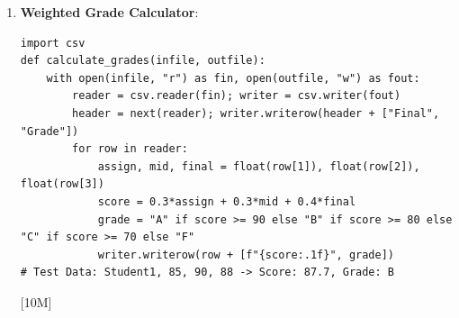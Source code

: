 \begin{solutionbox}
\begin{enumerate}[start=17]
\begin{lstlisting}[language=Python3]
def rle_verify(infile, compfile):
    with open(infile, "r") as f: orig = f.read()
    with open(compfile, "r") as f: comp = f.read()
    import re
    decomp = "".join(char * int(num) for char, num in re.findall(r'(.)(\d+)', comp))
    assert orig == decomp, "Mismatch!"
    print("Verification Passed")
    \end{lstlisting} [10M]
    \item \textbf{Weighted Grade Calculator}:
    \begin{lstlisting}[language=Python3]
import csv
def calculate_grades(infile, outfile):
    with open(infile, "r") as fin, open(outfile, "w") as fout:
        reader = csv.reader(fin); writer = csv.writer(fout)
        header = next(reader); writer.writerow(header + ["Final", "Grade"])
        for row in reader:
            assign, mid, final = float(row[1]), float(row[2]), float(row[3])
            score = 0.3*assign + 0.3*mid + 0.4*final
            grade = "A" if score >= 90 else "B" if score >= 80 else "C" if score >= 70 else "F"
            writer.writerow(row + [f"{score:.1f}", grade])
# Test Data: Student1, 85, 90, 88 -> Score: 87.7, Grade: B
    \end{lstlisting} [10M]
\end{enumerate}
\end{solutionbox}
